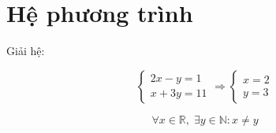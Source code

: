 \documentclass[12pt,a4paper]{article}
\begin{document}
\section*{Hệ phương trình}
Giải hệ:

\[ \begin{cases}2x-y=1\\x+3y=11\end{cases}\Rightarrow\begin{cases}x=2\\y=3\end{cases} \]

\[ \forall x\in\mathbb{R},\;\exists y\in\mathbb{N}: x\neq y \]
\end{document}
